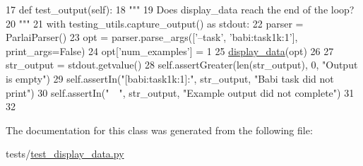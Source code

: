 \begin{DoxyCode}
17     \textcolor{keyword}{def }test\_output(self):
18         \textcolor{stringliteral}{"""}
19 \textcolor{stringliteral}{        Does display\_data reach the end of the loop?}
20 \textcolor{stringliteral}{        """}
21         with testing\_utils.capture\_output() \textcolor{keyword}{as} stdout:
22             parser = ParlaiParser()
23             opt = parser.parse\_args([\textcolor{stringliteral}{'--task'}, \textcolor{stringliteral}{'babi:task1k:1'}], print\_args=\textcolor{keyword}{False})
24             opt[\textcolor{stringliteral}{'num\_examples'}] = 1
25             \hyperlink{namespacedisplay__data}{display\_data}(opt)
26 
27         str\_output = stdout.getvalue()
28         self.assertGreater(len(str\_output), 0, \textcolor{stringliteral}{"Output is empty"})
29         self.assertIn(\textcolor{stringliteral}{"[babi:task1k:1]:"}, str\_output, \textcolor{stringliteral}{"Babi task did not print"})
30         self.assertIn(\textcolor{stringliteral}{"~~"}, str\_output, \textcolor{stringliteral}{"Example output did not complete"})
31 
32 
\end{DoxyCode}


The documentation for this class was generated from the following file\+:\begin{DoxyCompactItemize}
\item 
tests/\hyperlink{test__display__data_8py}{test\+\_\+display\+\_\+data.\+py}\end{DoxyCompactItemize}
